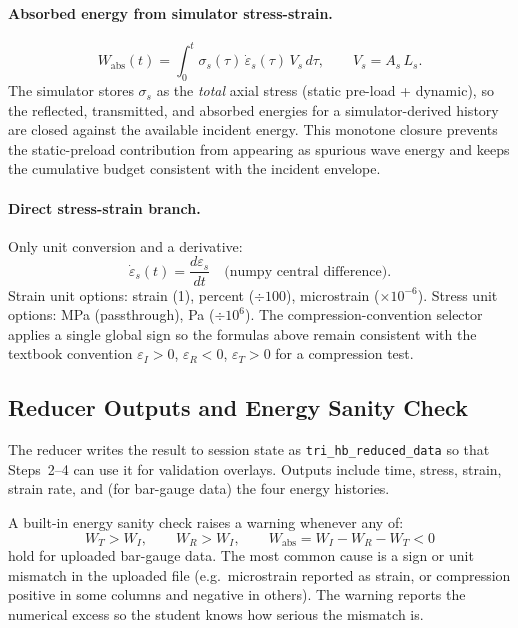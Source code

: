 \documentclass[11pt,a4paper]{article}
\newcommand{\sig}{\sigma}
\newcommand{\eps}{\varepsilon}
\newcommand{\epsdot}{\dot\eps}
\newcommand{\As}{A_s}
\newcommand{\Ls}{L_s}
\begin{document}
\paragraph{Absorbed energy from simulator stress-strain.}
\begin{equation}
  W_{\text{abs}}(t) = \int_0^t \sig_s(\tau)\,\epsdot_s(\tau)\,V_s\,d\tau,
  \qquad V_s = \As\,\Ls.
\end{equation}
The simulator stores $\sig_s$ as the \emph{total} axial stress (static pre-load
+ dynamic), so the reflected, transmitted, and absorbed energies for a
simulator-derived history are closed against the available incident energy.
This monotone closure prevents the static-preload contribution from appearing
as spurious wave energy and keeps the cumulative budget consistent with the
incident envelope.

\paragraph{Direct stress-strain branch.}
Only unit conversion and a derivative:
\begin{equation}
  \epsdot_s(t) = \frac{d\eps_s}{dt} \quad \text{(numpy central difference)}.
\end{equation}
Strain unit options: strain (1), percent (\(\div 100\)), microstrain
(\(\times 10^{-6}\)). Stress unit options: MPa (passthrough), Pa
(\(\div 10^6\)). The compression-convention selector applies a single global
sign so the formulas above remain consistent with the textbook convention
$\eps_I > 0$, $\eps_R < 0$, $\eps_T > 0$ for a compression test.

\subsection{Reducer Outputs and Energy Sanity Check}

The reducer writes the result to session state as
\texttt{tri\_hb\_reduced\_data} so that Steps~2--4 can use it for validation
overlays. Outputs include time, stress, strain, strain rate, and (for bar-gauge
data) the four energy histories.

A built-in energy sanity check raises a warning whenever any of:
\[
  W_T > W_I, \qquad W_R > W_I, \qquad W_{\text{abs}} = W_I - W_R - W_T < 0
\]
hold for uploaded bar-gauge data. The most common cause is a sign or unit
mismatch in the uploaded file (e.g.\ microstrain reported as strain, or
compression positive in some columns and negative in others). The warning
reports the numerical excess so the student knows how serious the mismatch is.
\end{document}
